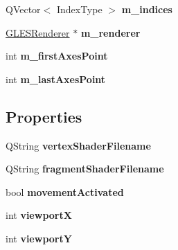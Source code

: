 \begin{DoxyCompactItemize}
Q\+Vector$<$ Index\+Type $>$ {\bfseries m\+\_\+indices}
\item 
\mbox{\label{class_g_l_item_aa23f231003107c152ad26180e02dd428}} 
\mbox{\hyperlink{class_g_l_e_s_renderer}{G\+L\+E\+S\+Renderer}} $\ast$ {\bfseries m\+\_\+renderer}
\item 
\mbox{\label{class_g_l_item_a770f91579acd280f401ac242c1800957}} 
int {\bfseries m\+\_\+first\+Axes\+Point}
\item 
\mbox{\label{class_g_l_item_a08d819a2e323706eaebda482fa0c06c2}} 
int {\bfseries m\+\_\+last\+Axes\+Point}
\end{DoxyCompactItemize}
\subsection*{Properties}
\begin{DoxyCompactItemize}
\item 
\mbox{\label{class_g_l_item_aa18b199e7c5d8a1c0a288dc45b12c8c6}} 
Q\+String {\bfseries vertex\+Shader\+Filename}
\item 
\mbox{\label{class_g_l_item_a81e33a49ac37afcc322c703b55cd6071}} 
Q\+String {\bfseries fragment\+Shader\+Filename}
\item 
\mbox{\label{class_g_l_item_aad3da5ba5d67c4f44430e6ed3b2cc8bc}} 
bool {\bfseries movement\+Activated}
\item 
\mbox{\label{class_g_l_item_a91dc1c10352ee468fd0804162967a2c5}} 
int {\bfseries viewportX}
\item 
\mbox{\label{class_g_l_item_a2703487de4b0843c256861f914b57208}} 
int {\bfseries viewportY}
\end{DoxyCompactItemize}


